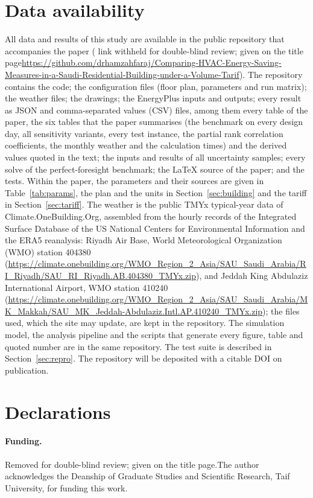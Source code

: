 \documentclass[10pt,a4paper,twocolumn]{article}
\theoremstyle{definition}
\begin{document}
\section*{Data availability}
All data and results of this study are available in the public repository that accompanies the paper (\ifnum{} link withheld for double-blind review; given on the title page\else \url{https://github.com/drhamzahfaraj/Comparing-HVAC-Energy-Saving-Measures-in-a-Saudi-Residential-Building-under-a-Volume-Tarif}\fi). The repository contains the code; the configuration files (floor plan, parameters and run matrix); the weather files; the drawings; the EnergyPlus inputs and outputs; every result as JSON and comma-separated values (CSV) files, among them every table of the paper, the six tables that the paper summarises (the benchmark on every design day, all sensitivity variants, every test instance, the partial rank correlation coefficients, the monthly weather and the calculation times) and the derived values quoted in the text; the inputs and results of all uncertainty samples; every solve of the perfect-foresight benchmark; the LaTeX source of the paper; and the tests. Within the paper, the parameters and their sources are given in Table~\ref{tab:params}, the plan and the units in Section~\ref{sec:building} and the tariff in Section~\ref{sec:tariff}. The weather is the public TMYx typical-year data of Climate.OneBuilding.Org, assembled from the hourly records of the Integrated Surface Database of the US National Centers for Environmental Information and the ERA5 reanalysis: Riyadh Air Base, World Meteorological Organization (WMO) station 404380 (\url{https://climate.onebuilding.org/WMO_Region_2_Asia/SAU_Saudi_Arabia/RI_Riyadh/SAU_RI_Riyadh.AB.404380_TMYx.zip}), and Jeddah King Abdulaziz International Airport, WMO station 410240 (\url{https://climate.onebuilding.org/WMO_Region_2_Asia/SAU_Saudi_Arabia/MK_Makkah/SAU_MK_Jeddah-Abdulaziz.Intl.AP.410240_TMYx.zip}); the files used, which the site may update, are kept in the repository. The simulation model, the analysis pipeline and the scripts that generate every figure, table and quoted number are in the same repository. The test suite is described in Section~\ref{sec:repro}. The repository will be deposited with a citable DOI on publication.

\section*{Declarations}
\paragraph{Funding.} \ifnum{} Removed for double-blind review; given on the title page.\else The author acknowledges the Deanship of Graduate Studies and Scientific Research, Taif University, for funding this work.\fi
\end{document}
